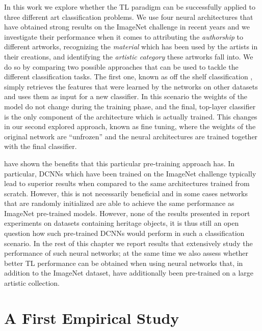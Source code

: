 In this work we explore whether the TL paradigm can be successfully applied to three different art classification problems. We use four neural architectures that have obtained strong results on the ImageNet challenge in recent years and we investigate their performance when it comes to attributing the \textit{authorship} to different artworks, recognizing the \textit{material} which has been used by the artists in their creations, and identifying the \textit{artistic category} these artworks fall into. We do so by comparing two possible approaches that can be used to tackle the different classification tasks. The first one, known as off the shelf classification \cite{razavian2014cnn}, simply retrieves the features that were learned by the networks on other datasets and uses them as input for a new classifier. In this scenario the weights of the model do not change during the training phase, and the final, top-layer classifier is the only component of the architecture which is actually trained. This changes in our second explored approach, known as fine tuning, where the weights of the original network are ``unfrozen'' and the neural architectures are trained together with the final classifier. 

\citet{kornblith2018better} have shown the benefits that this particular pre-training approach has. In particular, DCNNs which have been trained on the ImageNet challenge typically lead to superior results when compared to the same architectures trained from scratch. However, this is not necessarily beneficial and in some cases networks that are randomly initialized are able to achieve the same performance as ImageNet pre-trained models. However, none of the results presented in \cite{kornblith2018better} report experiments on datasets containing heritage objects, it is thus still an open question how such pre-trained DCNNs would perform in such a classification scenario. In the rest of this chapter we report results that extensively study the performance of such neural networks; at the same time we also assess whether better TL performance can be obtained when using neural networks that, in addition to the ImageNet dataset, have additionally been pre-trained on a large artistic collection.  

\fi

\section{A First Empirical Study}
\label{sec:ch_4_introduction}

